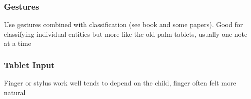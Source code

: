 \subsubsection{Gestures}

Use gestures combined with classification (see book and some papers).
Good for classifying individual entities but more like the old palm tablets, usually one note at a time

\subsubsection{Tablet Input}

Finger or stylus work well tends to depend on the child, finger often felt more natural

